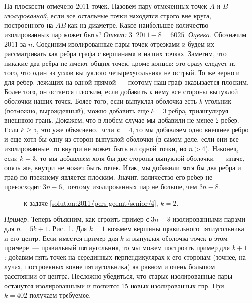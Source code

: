 \problem
На плоскости отмечено $2011$ точек.
Назовем пару отмеченных точек $A$ и $B$ \emph{изолированной}, если все остальные
точки находятся строго вне круга, построенного на $AB$ как на диаметре.
Какое наибольшее количество изолированных пар может быть?
\solution
\label{solution:2011/pers-geomt/senior/4}%
\emph{Ответ:}
$3 \cdot 2011 - 8 = 6025$.
\emph{Оценка.}
Обозначим $2011$ за $n$.
Соединим изолированные пары точек отрезками и будем их рассматривать как ребра
графа с вершинами в наших точках.
Заметим, что никакие два ребра не имеют общих точек, кроме концов:
это сразу следует из того, что один из углов выпуклого четырехугольника не
острый.
То же верно и для ребер, лежащих на одной прямой~--- поэтому наш граф
оказывается плоским.
Более того, он остается плоским, если добавить к нему все стороны выпуклой
оболочки наших точек.
Более того, если выпуклая оболочка есть $k$-угольник (возможно, вырожденный),
можно добавить еще $k - 3$ ребра, триангулируя внешнюю грань.
Докажем, что в любом случае мы добавили не менее 2 ребер.
Если $k \geq 5$, это уже объяснено.
Если $k = 4$, то мы добавляем одно внешнее ребро и еще хотя бы одну из сторон
выпуклой оболочки
(в самом деле, если они все изолированные, то внутри не может быть ни одной
точки, но $n > 4$).
Наконец, если $k = 3$, то мы добавляем хотя бы две стороны выпуклой
оболочки~--- иначе, опять же, внутри не может быть точек.
Итак, мы добавили хотя бы два ребра и граф по-прежнему является плоским.
Значит, количество его ребер не превосходит $3 n - 6$, поэтому изолированных
пар не больше, чем $3 n - 8$.
\\
\begin{figure}
\centering
\caption{к задаче \ref{solution:2011/pers-geomt/senior/4}, $k = 2$.}
\label{fig:solution:2011/pers-geomt/senior/4}
\end{figure}%
\emph{Пример.}
Теперь объясним, как строить пример с $3 n - 8$ изолированными парами для
$n = 5 k + 1$.
Рис.~\ref{fig:solution:2011/pers-geomt/senior/4}.
Для $k = 1$ возьмем вершины правильного пятиугольника и его центр.
Если имеется пример для $k$ и выпуклая оболочка точек в этом примере~---
правильный пятиугольник, то мы можем построить пример для $k + 1$:
добавим пять точек на серединных перпендикулярах к его сторонам (точнее, на
лучах, построенных вовне пятиугольника) на равном и очень большом расстоянии от
центра.
Несложно убедиться, что старые изолированные пары останутся изолированными и
появится 15 новых изолированных пар.
При $k = 402$ получаем требуемое.
\endproblem
